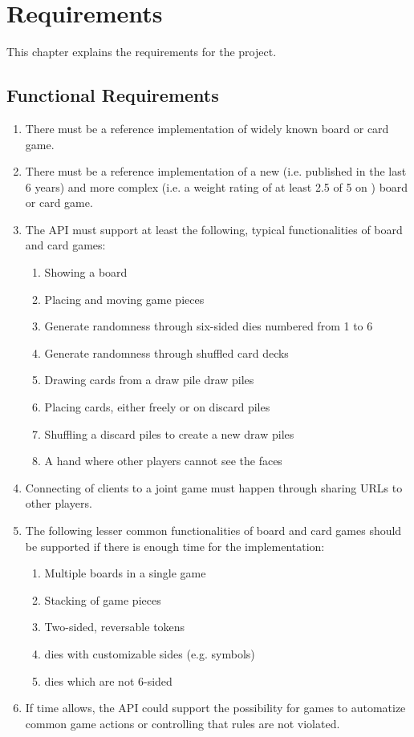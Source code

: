 \chapter{Requirements} \label{chap:requirements}

This chapter explains the requirements for the project.

\section{Functional Requirements}

\begin{enumerate}
  \item There must be a reference implementation of widely known board or card
  game.
  \item There must be a reference implementation of a new (i.e. published in
  the last 6 years) and more complex (i.e. a weight rating of at least 2.5 of 5
  on \cite{BGG}) board or card game.
  \item The API must support at least the following, typical functionalities of
  board and card games:
  \begin{enumerate}
    \item Showing a board
    \item Placing and moving game pieces
    \item Generate randomness through six-sided \glspl{die} numbered from 1 to 6
    \item Generate randomness through shuffled card \glspl{deck}
    \item Drawing cards from a \gls{draw pile}
    \glspl{draw pile}
    \item Placing cards, either freely or on \glspl{discard pile}
    \item Shuffling a \glspl{discard pile} to create a new \glspl{draw pile}
    \item A \gls{hand} where other players cannot see the \glspl{face}
  \end{enumerate}
  \item Connecting of clients to a joint game must happen through sharing URLs
  to other players.
  \item The following lesser common functionalities of board and card games
  should be supported if there is enough time for the implementation:
  \begin{enumerate}
    \item Multiple boards in a single game
    \item Stacking of game pieces
    \item Two-sided, reversable tokens
    \item \Glspl{die} with customizable sides (e.g. symbols)
    \item \Glspl{die} which are not 6-sided
  \end{enumerate}
  \item If time allows, the API could support the possibility for games to
  automatize common game actions or controlling that rules are not violated.
\end{enumerate}

